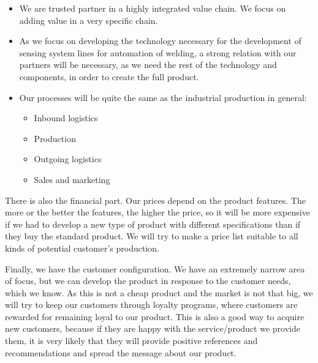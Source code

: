 \begin{itemize}
\item We are trusted partner in a highly integrated value chain. We focus on adding value in a very specific chain.
\item As we focus on developing the technology necessary for the development of sensing system lines for automation of welding, a strong relation with our partners will be necessary, as we need the rest of the technology and components, in order to create the full product.
\item Our processes will be quite the same as the industrial production in general:
\begin{itemize}
\item Inbound logistics
\item Production
\item Outgoing logistics
\item Sales and marketing
\end{itemize}
\end{itemize}

There is also the financial part. 
Our prices depend on the product features. 
The more or the better the features, the higher the price, so it will be more expensive if we had to develop a new type of product with different specifications than if they buy the standard product. We will try to make a price list suitable to all kinds of potential customer's production.

Finally, we have the customer configuration. 
We have an extremely narrow area of focus, but we can develop the product in response to the customer needs, which we know. 
As this is not a cheap product and the market is not that big, we will try to keep our customers through loyalty programs, where customers are rewarded for remaining loyal to our product. 
This is also a good way to acquire new customers, because if they are happy with the service/product we provide them, it is very likely that they will provide positive references and recommendations and spread the message about our product.


